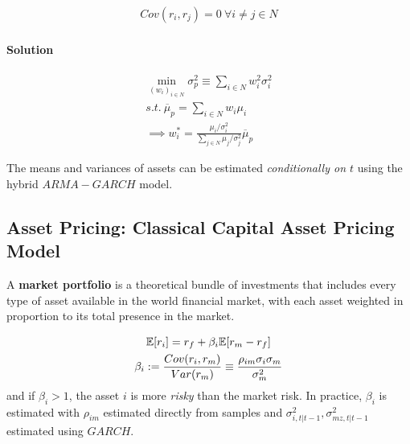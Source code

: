 \documentclass[11pt]{article}
\begin{document}
			\begin{assumption}
				\begin{gather}
					Cov(r_i, r_j) = 0\ \forall i \neq j \in N
				\end{gather}
			\end{assumption}
			
			\paragraph{Solution}
			\begin{gather}
				\min_{(w_i)_{i \in N}} \sigma_p^2 \equiv \sum_{i \in N} w_i^2 \sigma_i^2 \\
				s.t.\ \overline{\mu}_p = \sum_{i \in N} w_i \mu_i \\
				\implies w_i^* = \frac{
					\mu_i/\sigma_i^2
				}{
					\sum_{j \in N} \mu_j/\sigma_j^2
				}\overline{\mu}_p
			\end{gather}
			
			\begin{remark}
				The means and variances of assets can be estimated \emph{conditionally on $t$} using the hybrid $ARMA-GARCH$ model.
			\end{remark}
		
		\subsection{Asset Pricing: Classical Capital Asset Pricing Model}
			\begin{definition}
				A \textbf{market portfolio} is a theoretical bundle of investments that includes every type of asset available in the world financial market, with each asset weighted in proportion to its total presence in the market.
			\end{definition}
			
			\begin{proposition}
				\begin{gather}
					\mathbb{E}[{r_i}] = r_f + \beta_i \mathbb{E}[{r_m - r_f}] \\
					\beta_i := \frac{Cov(r_i, r_m)}{Var(r_m)} \equiv \frac{\rho_{im}\sigma_i \sigma_m}{\sigma_m^2}
				\end{gather}
				and if $\beta_i > 1$, the asset $i$ is more \emph{risky} than the market risk. In practice, $\beta_i$ is estimated with $\rho_{im}$ estimated directly from samples and $\sigma^2_{i, t|t-1}, \sigma^2_{mz, t|t-1}$ estimated using $GARCH$.
			\end{proposition}
	
\end{document}
